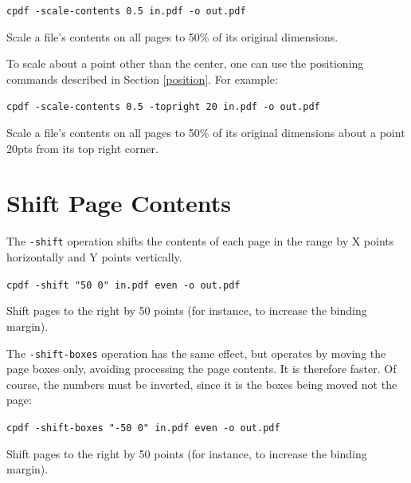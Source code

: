 \documentclass{book}
\begin{document}
  \begin{framed}
  \small\noindent\verb!cpdf -scale-contents 0.5 in.pdf -o out.pdf!

  \vspace{2.5mm}
  \noindent Scale a file's contents on all pages to 50\% of its original dimensions.
  \end{framed}

  \noindent To scale about a point other than the center, one can use the positioning commands described in Section \ref{position}. For example:
  
  \begin{framed}
  \small\noindent\verb!cpdf -scale-contents 0.5 -topright 20 in.pdf -o out.pdf!

  \vspace{2.5mm}
  \noindent Scale a file's contents on all pages to 50\% of its original dimensions about a point 20pts from its top right corner.
  \end{framed}

  

  \section{Shift Page Contents}

  The \texttt{-shift} operation shifts the contents of each page in the range
by X points horizontally and Y points vertically.

  \begin{framed}
  \small\noindent\verb!cpdf -shift "50 0" in.pdf even -o out.pdf!

  \vspace{2.5mm}

  \noindent Shift pages to the right by 50 points (for instance, to increase
the binding margin).\end{framed}

\noindent The \texttt{-shift-boxes} operation has the same effect, but operates by moving the page boxes only, avoiding processing the page contents. It is therefore faster. Of course, the numbers must be inverted, since it is the boxes being moved not the page:

  \begin{framed}
  \small\noindent\verb!cpdf -shift-boxes "-50 0" in.pdf even -o out.pdf!

  \vspace{2.5mm}

  \noindent Shift pages to the right by 50 points (for instance, to increase
the binding margin).\end{framed}
\end{document}
